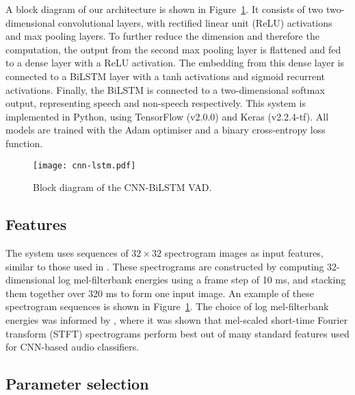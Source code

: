 \documentclass{article}
\begin{document}
A block diagram of our architecture is shown in \mbox{Figure \ref{fig:architecture}}.
It consists of two two-dimensional convolutional layers, with rectified linear unit (ReLU) activations and max pooling layers.
To further reduce the dimension and therefore the computation, the output from the second max pooling layer is flattened and fed to a dense layer with a ReLU activation.
The embedding from this dense layer is connected to a BiLSTM layer with a tanh activations and sigmoid recurrent activations.
Finally, the BiLSTM is connected to a two-dimensional softmax output, representing speech and non-speech respectively.
This system is implemented in Python, using TensorFlow (v2.0.0) and Keras (v2.2.4-tf).
All models are trained with the Adam optimiser \cite{Adam} and a binary cross-entropy loss function.

\begin{figure}\begin{minipage}[b]{1.0\linewidth}
  \centering
  \centerline{\texttt{[image: cnn-lstm.pdf]}}
\end{minipage}
\vspace{-6mm}
\caption{Block diagram of the CNN-BiLSTM VAD.}
\label{fig:architecture}

\end{figure}

\vspace{-2mm}

\subsection{Features}
\label{ssec:feats}

\vspace{-2mm}

The system uses sequences of $32\times32$ spectrogram images as input features, similar to those used in \cite{SmallCNN}.
These spectrograms are constructed by computing 32-dimensional log mel-filterbank energies using a frame step of 10 ms, and stacking them together over 320 ms to form one input image.
An example of these spectrogram sequences is shown in \mbox{Figure \ref{fig:architecture}}.
The choice of log mel-filterbank energies was informed by \cite{features}, where it was shown that mel-scaled short-time Fourier transform (STFT) spectrograms perform best out of many standard features used for CNN-based audio classifiers.

\vspace{-2mm}

\subsection{Parameter selection}
\label{ssec:params}
\end{document}

